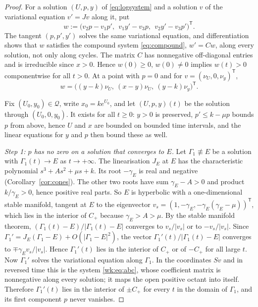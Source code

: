 \begin{proof}
For a solution $(U,p,y)$ of \eqref{eq:logsystem} and a solution $v$ of the variational equation $v'=Jv$ along it, put
\begin{equation}\label{wk:eq:wedge}
w:=\bigl(v_2p-v_1p',\ \ v_1y'-v_3p,\ \ v_2y'-v_3p'\bigr)^{\mathsf T}.
\end{equation}
The tangent $(p,p',y')$ solves the same variational equation, and differentiation shows that $w$ satisfies the compound system \eqref{eq:compound}, $w'=Cw$, along every solution, not only along cycles. The matrix $C$ has nonnegative off-diagonal entries and is irreducible since $x>0$. Hence $w(0)\ge0$, $w(0)\ne0$ implies $w(t)>0$ componentwise for all $t>0$. At a point with $p=0$ and for $v=(\nu_U,0,\nu_y)^{\mathsf T}$,
\begin{equation}\label{wk:eq:wedge0}
w=\bigl((y-k)\nu_U,\ (x-y)\nu_U,\ (y-k)\nu_y\bigr)^{\mathsf T}.
\end{equation}

Fix $(U_0,y_0)\in\mathcal Q$, write $x_0=ke^{U_0}$, and let $(U,p,y)(t)$ be the solution through $(U_0,0,y_0)$. It exists for all $t\ge0$: $y>0$ is preserved, $p'\le k-\mu p$ bounds $p$ from above, hence $U$ and $x$ are bounded on bounded time intervals, and the linear equations for $y$ and $p$ then bound these as well.

\emph{Step 1: $p$ has no zero on a solution that converges to $E$.} Let $\Gamma_1\not\equiv E$ be a solution with $\Gamma_1(t)\to E$ as $t\to+\infty$. The linearisation $J_E$ at $E$ has the characteristic polynomial $s^3+As^2+\mu s+k$. Its root $-\gamma_E$ is real and negative (Corollary~\ref{cor:cones}). The other two roots have sum $\gamma_E-A>0$ and product $k/\gamma_E>0$, hence positive real parts. So $E$ is hyperbolic with a one-dimensional stable manifold, tangent at $E$ to the eigenvector $v_s=(1,-\gamma_E,-\gamma_E(\gamma_E-\mu))^{\mathsf T}$, which lies in the interior of $C_+$ because $\gamma_E>A>\mu$. By the stable manifold theorem, $(\Gamma_1(t)-E)/|\Gamma_1(t)-E|$ converges to $v_s/|v_s|$ or to $-v_s/|v_s|$. Since $\Gamma_1'=J_E(\Gamma_1-E)+O(|\Gamma_1-E|^2)$, the vector $\Gamma_1'(t)/|\Gamma_1(t)-E|$ converges to $\mp\gamma_Ev_s/|v_s|$. Hence $\Gamma_1'(t)$ lies in the interior of $C_+$ or of $-C_+$ for all large $t$. Now $\Gamma_1'$ solves the variational equation along $\Gamma_1$. In the coordinates $Sv$ and in reversed time this is the system \eqref{wk:eq:abc}, whose coefficient matrix is nonnegative along every solution; it maps the open positive octant into itself. Therefore $\Gamma_1'(t)$ lies in the interior of $\pm C_+$ for every $t$ in the domain of $\Gamma_1$, and its first component $p$ never vanishes.


\end{proof}
